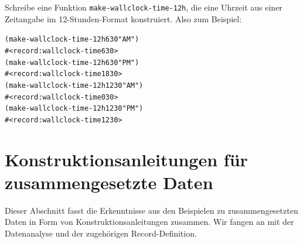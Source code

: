 \begin{aufgabeinline}
  Schreibe eine Funktion \texttt{make-wallclock-time-12h}, die eine
  Uhrzeit aus einer Zeitangabe im 12-Stunden-Format konstruiert.  Also
  zum Beispiel:
\begin{alltt}
(make-wallclock-time-12h 6 30 "AM")
\evalsto{} #<record:wallclock-time 6 30>
(make-wallclock-time-12h 6 30 "PM")
\evalsto{} #<record:wallclock-time 18 30>
(make-wallclock-time-12h 12 30 "AM")
\evalsto{} #<record:wallclock-time 0 30>
(make-wallclock-time-12h 12 30 "PM")
\evalsto{} #<record:wallclock-time 12  30>
\end{alltt}
\end{aufgabeinline}

\section{Konstruktionsanleitungen für zusammengesetzte Daten}

Dieser Abschnitt fasst die Erkenntnisse aus den Beispielen
zu zusammengesetzten Daten in Form von Konstruktionsanleitungen
zusammen.  Wir fangen an mit der Datenanalyse und der zugehörigen
Record-Definition.

